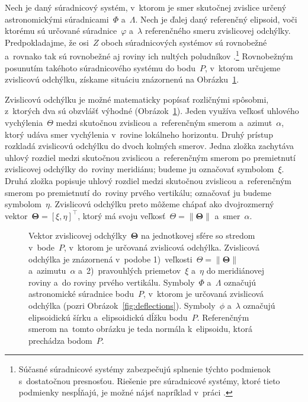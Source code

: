 \documentclass[a4paper,12pt]{book}
\begin{document}
Nech je daný súradnicový systém, v~ktorom je smer skutočnej zvislice určený 
astronomickými súradnicami~$\Phi$ a~$\Lambda$.  Nech je ďalej daný referenčný 
elipsoid, voči ktorému sú určované súradnice~$\varphi$ a~$\lambda$ referenčného 
smeru zvislicovej odchýlky.  Predpokladajme, že osi~$Z$ oboch súradnicových 
systémov sú rovnobežné a~rovnako tak sú rovnobežné aj roviny ich nultých 
poludníkov \parencite{TorgeGeodesy}.\footnote{Súčasné súradnicové systémy 
zabezpečujú splnenie týchto podmienok s~dostatočnou presnosťou.  Riešenie pre 
súradnicové systémy, ktoré tieto podmienky nespĺňajú, je možné nájsť napríklad 
v~práci \textcite{Pick2000}.}  Rovnobežným posunutím takéhoto súradnicového 
systému do bodu~$P$, v~ktorom určujeme zvislicovú odchýlku, získame situáciu 
znázornenú na Obrázku~\ref{fig:deflections_unit_sphere}.

Zvislicovú odchýlku je možné matematicky popísať rozličnými spôsobmi, z~ktorých 
dva sú obzvlášť výhodné (Obrázok~\ref{fig:deflections_unit_sphere}).  Jeden 
využíva veľkosť uhlového vychýlenia~$\Theta$ medzi skutočnou zvislicou 
a~referenčným smerom a~azimut~$\alpha$, ktorý udáva smer vychýlenia v~rovine 
lokálneho horizontu.  Druhý prístup rozkladá zvislicovú odchýlku do dvoch 
kolmých smerov.  Jedna zložka zachytáva uhlový rozdiel medzi skutočnou 
zvislicou a~referenčným smerom po premietnutí zvislicovej odchýlky do~roviny 
meridiánu; budeme ju označovať symbolom~$\xi$.  Druhá zložka popisuje uhlový 
rozdiel medzi skutočnou zvislicou a~referenčným smerom po premietnutí do~roviny 
prvého vertikálu; označovať ju budeme symbolom~$\eta$.  Zvislicovú odchýlku 
preto môžeme chápať ako dvojrozmerný vektor~$\boldsymbol\Theta = [\xi, 
\eta]^\top$, ktorý má svoju veľkosť~$\Theta = \| \boldsymbol\Theta \|$ 
a~smer~$\alpha$.

\begin{figure}[bt]
\centering

\caption{Vektor zvislicovej odchýlky~$\boldsymbol\Theta$ na jednotkovej sfére 
so stredom v~bode~$P$, v~ktorom je určovaná zvislicová odchýlka.  Zvislicová 
odchýlka je znázornená v~podobe 1)~veľkosti~$\Theta = \| \boldsymbol\Theta \|$ 
a~azimutu~$\alpha$ a~2)~pravouhlých priemetov~$\xi$ a~$\eta$ do meridiánovej 
roviny a~do roviny prvého vertikálu.  Symboly~$\Phi$ a~$\Lambda$ označujú 
astronomické súradnice bodu~$P$, v~ktorom je určovaná zvislicová odchýlka 
(pozri Obrázok~\ref{fig:deflections}).  Symboly~$\phi$ a~$\lambda$ označujú 
elipsoidickú šírku a~elipsoidickú dĺžku bodu~$P$.  Referenčným smerom na~tomto 
obrázku je teda normála k~elipsoidu, ktorá prechádza bodom~$P$.}
\label{fig:deflections_unit_sphere}
\end{figure}
\end{document}
